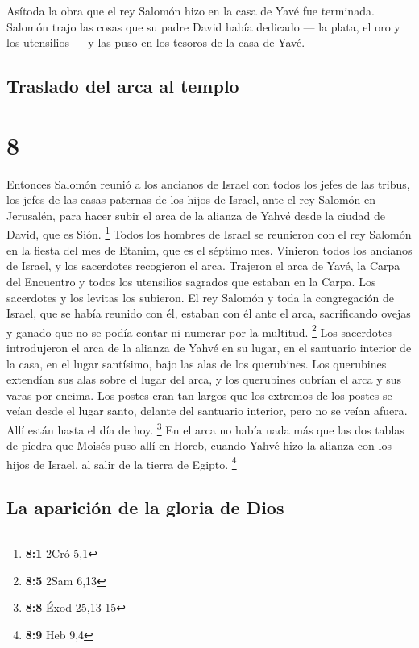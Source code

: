  Asítoda la obra que el rey Salomón hizo en la casa de
Yavé fue terminada. Salomón trajo las cosas que su padre David había
dedicado --- la plata, el oro y los utensilios --- y las puso en los
tesoros de la casa de Yavé.

\hypertarget{traslado-del-arca-al-templo}{%
\subsection{Traslado del arca al
templo}\label{traslado-del-arca-al-templo}}

\hypertarget{section-7}{%
\section{8}\label{section-7}}

 Entonces Salomón reunió a los ancianos de Israel con
todos los jefes de las tribus, los jefes de las casas paternas de los
hijos de Israel, ante el rey Salomón en Jerusalén, para hacer subir el
arca de la alianza de Yahvé desde la ciudad de David, que es Sión.
\footnote{\textbf{8:1} 2Cró 5,1}  Todos los hombres de
Israel se reunieron con el rey Salomón en la fiesta del mes de Etanim,
que es el séptimo mes.  Vinieron todos los ancianos de
Israel, y los sacerdotes recogieron el arca.  Trajeron el
arca de Yavé, la Carpa del Encuentro y todos los utensilios sagrados que
estaban en la Carpa. Los sacerdotes y los levitas los subieron.
 El rey Salomón y toda la congregación de Israel, que se
había reunido con él, estaban con él ante el arca, sacrificando ovejas y
ganado que no se podía contar ni numerar por la multitud. \footnote{\textbf{8:5}
  2Sam 6,13}  Los sacerdotes introdujeron el arca de la
alianza de Yahvé en su lugar, en el santuario interior de la casa, en el
lugar santísimo, bajo las alas de los querubines.  Los
querubines extendían sus alas sobre el lugar del arca, y los querubines
cubrían el arca y sus varas por encima.  Los postes eran
tan largos que los extremos de los postes se veían desde el lugar santo,
delante del santuario interior, pero no se veían afuera. Allí están
hasta el día de hoy. \footnote{\textbf{8:8} Éxod 25,13-15}
 En el arca no había nada más que las dos tablas de piedra
que Moisés puso allí en Horeb, cuando Yahvé hizo la alianza con los
hijos de Israel, al salir de la tierra de Egipto. \footnote{\textbf{8:9}
  Heb 9,4}

\hypertarget{la-apariciuxf3n-de-la-gloria-de-dios}{%
\subsection{La aparición de la gloria de
Dios}\label{la-apariciuxf3n-de-la-gloria-de-dios}}

